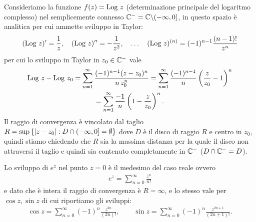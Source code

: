 \begin{example}
  Consideriamo la funzione $ f(z) = \textnormal{Log } z $ (determinazione principale del logaritmo complesso) nel semplicemente connesso $ \mathbb{C}^- = \mathbb{C} \backslash (-\infty,0] $, 
  in questo spazio è analitica per cui ammette sviluppo in Taylor:
  \begin{align}
    (\textnormal{Log } z)' = \frac1z,\quad (\textnormal{Log } z)'' = - \frac1{z^2},\quad \dots\quad(\textnormal{Log } z)^{(n)} = (-1)^{n - 1} \frac{(n-1)!}{z^n}
  \end{align}
  per cui lo sviluppo in Taylor in $ z_0 \in \mathbb{C}^- $ vale
  \begin{gather}
    \textnormal{Log } z - \textnormal{Log } z_0 = \sum_{n = 1}^\infty \frac{(-1)^{n-1}(z - z_0)^n}{n\, z_0^n} 
    = \sum_{n = 1}^\infty \frac{(-1)^{n-1}}{n} \left( \frac{z}{z_0} - 1 \right)^n 
    \\
    = \sum_{n = 1}^\infty \frac{-1}{n} \left( 1 - \frac{z}{z_0} \right)^n.
  \end{gather}
  Il raggio di convergenza è vincolato dal taglio $ R = \sup\,\{ \left|{z -z_0}\right| : D \cap (-\infty, 0] = \emptyset \} $ dove $ D $ è il disco di raggio $ R $ 
  e centro in $ z_0 $, quindi stiamo chiedendo che $ R $ sia la massima distanza per la quale il disco non attraversi il taglio e quindi sia contenuto 
  completamente in $ \mathbb{C}^- $ ($ D \cap \mathbb{C}^- = D $).
\end{example}

\begin{example}
  Lo sviluppo di $ e^z $ nel punto $ z = 0 $ è il medesimo del caso reale ovvero
  \begin{align}
    e^z = \sum_{n = 0}^\infty \frac{z^n}{n!}
  \end{align}
  e dato che è intera il raggio di convergenza è $ R = \infty $, e lo stesso vale per $ \cos z, \sin z $ di cui riportiamo gli sviluppi:
  \begin{align}
    \cos z = \sum_{n = 0}^{\infty} (-1)^n \frac{z^{2n}}{(2n)!}, \qquad \sin z = \sum_{n = 0}^{\infty} (-1)^n \frac{z^{2n + 1}}{(2n + 1)!}.
  \end{align}
\end{example}

